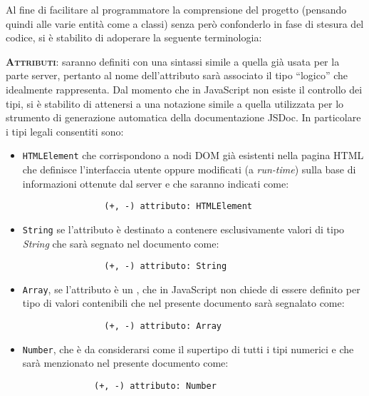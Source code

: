 Al fine di facilitare al programmatore la comprensione del progetto (pensando quindi alle varie entità come a classi) senza però confonderlo in fase di stesura del codice, si è stabilito di adoperare la seguente terminologia:

\begin{description}
	\item{\scshape\bfseries Attributi}: saranno definiti con una sintassi simile a quella già usata per la parte server, pertanto al nome dell'attributo sarà associato il tipo ``logico'' che idealmente rappresenta. Dal momento che in JavaScript non esiste il controllo dei tipi, si è stabilito di attenersi a una notazione simile a quella utilizzata per lo strumento di generazione automatica della documentazione JSDoc. In particolare i tipi legali consentiti sono:
	\begin{itemize}
	  \item \texttt{HTMLElement} che corrispondono a nodi DOM già esistenti nella pagina HTML che definisce l'interfaccia utente oppure modificati (a \textit{run-time}) sulla base di informazioni ottenute dal server e che saranno indicati come:
	  	\begin{verbatim}
				(+, -) attributo: HTMLElement
			\end{verbatim}
	
    \item \texttt{String} se l'attributo è destinato a contenere esclusivamente valori di tipo \textit{String} che sarà segnato nel documento come:
			
			\begin{verbatim}
				(+, -) attributo: String
			\end{verbatim}
			
			\item \texttt{Array}, se l'attributo è un , che in JavaScript non chiede di essere definito per tipo di valori contenibili che nel presente documento sarà segnalato come:
			
			\begin{verbatim}
				(+, -) attributo: Array
			\end{verbatim}
			
			\item \texttt{Number}, che è da considerarsi come il supertipo di tutti i tipi numerici e che sarà menzionato nel presente documento come:
			\begin{verbatim}
			  (+, -) attributo: Number
			\end{verbatim}
			

\end{itemize}
\end{description}

